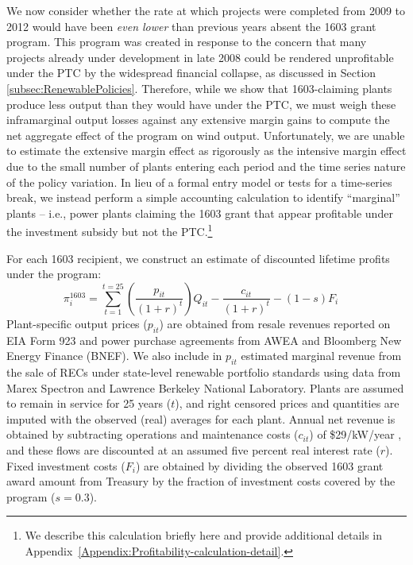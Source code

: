 \documentclass[12pt]{article}
\begin{document}
We now consider whether the rate at which projects were completed from 2009 to 2012 would have been \emph{even lower} than previous years absent the 1603 grant program. This program was created in response to the concern that many projects already under development in late 2008 could be rendered unprofitable under the PTC by the widespread financial collapse, as discussed in Section \ref{subsec:RenewablePolicies}. Therefore, while we show that 1603-claiming plants produce less output than they would have under the PTC, we must weigh these inframarginal output losses against any extensive margin gains to compute the net aggregate effect of the program on wind output. Unfortunately, we are unable to estimate the extensive margin effect as rigorously as the intensive margin effect due to the small number of plants entering each period and the time series nature of the policy variation. In lieu of a formal entry model or tests for a time-series break, we instead perform a simple accounting calculation to identify ``marginal'' plants  -- i.e., power plants claiming the 1603 grant that appear profitable under the investment subsidy but not the PTC.\footnote{We describe this calculation briefly here and provide additional details in Appendix~\ref{Appendix:Profitability-calculation-detail}.}

For each 1603 recipient, we construct an estimate of discounted lifetime profits under the program:
\begin{equation}
\pi_i^{1603}=\sum_{t=1}^{t=25} \left(\frac{p_{it}}{(1+r)^{t}}\right) Q_{it} - \frac{c_{it}}{(1+r)^{t}} -(1-s)F_i\label{eq:pi1603} \quad
\end{equation}
Plant-specific output prices ($p_{it}$) are obtained from resale revenues reported on EIA Form 923 and power purchase agreements from AWEA and Bloomberg New Energy Finance (BNEF). We also include in $p_{it}$ estimated marginal revenue from the sale of RECs under state-level renewable portfolio standards using data from Marex Spectron and Lawrence Berkeley National Laboratory. Plants are assumed to remain in service for 25 years ($t$), and right censored prices and quantities are imputed with the observed (real) averages for each plant. Annual net revenue is obtained by subtracting operations and maintenance costs ($c_{it}$) of \$29/kW/year \citep{wiser_2018_2019}, and these flows are discounted at an assumed five percent real interest rate ($r$). Fixed investment costs ($F_i$) are obtained by dividing the observed 1603 grant award amount from Treasury by the fraction of investment costs covered by the program ($s=0.3$).
\end{document}
